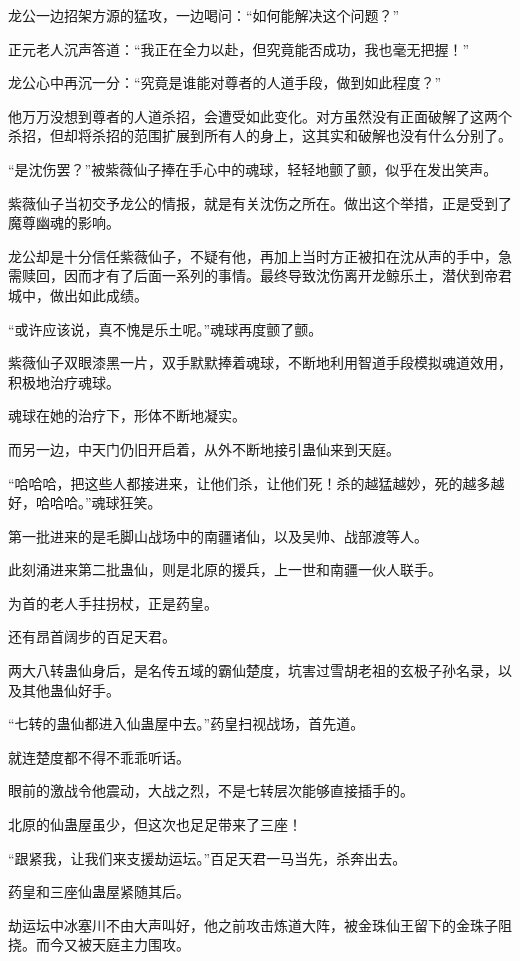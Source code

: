 \begin{this_body}
龙公一边招架方源的猛攻，一边喝问：“如何能解决这个问题？”

正元老人沉声答道：“我正在全力以赴，但究竟能否成功，我也毫无把握！”

龙公心中再沉一分：“究竟是谁能对尊者的人道手段，做到如此程度？”

他万万没想到尊者的人道杀招，会遭受如此变化。对方虽然没有正面破解了这两个杀招，但却将杀招的范围扩展到所有人的身上，这其实和破解也没有什么分别了。

“是沈伤罢？”被紫薇仙子捧在手心中的魂球，轻轻地颤了颤，似乎在发出笑声。

紫薇仙子当初交予龙公的情报，就是有关沈伤之所在。做出这个举措，正是受到了魔尊幽魂的影响。

龙公却是十分信任紫薇仙子，不疑有他，再加上当时方正被扣在沈从声的手中，急需赎回，因而才有了后面一系列的事情。最终导致沈伤离开龙鲸乐土，潜伏到帝君城中，做出如此成绩。

“或许应该说，真不愧是乐土呢。”魂球再度颤了颤。

紫薇仙子双眼漆黑一片，双手默默捧着魂球，不断地利用智道手段模拟魂道效用，积极地治疗魂球。

魂球在她的治疗下，形体不断地凝实。

而另一边，中天门仍旧开启着，从外不断地接引蛊仙来到天庭。

“哈哈哈，把这些人都接进来，让他们杀，让他们死！杀的越猛越妙，死的越多越好，哈哈哈。”魂球狂笑。

第一批进来的是毛脚山战场中的南疆诸仙，以及吴帅、战部渡等人。

此刻涌进来第二批蛊仙，则是北原的援兵，上一世和南疆一伙人联手。

为首的老人手拄拐杖，正是药皇。

还有昂首阔步的百足天君。

两大八转蛊仙身后，是名传五域的霸仙楚度，坑害过雪胡老祖的玄极子孙名录，以及其他蛊仙好手。

“七转的蛊仙都进入仙蛊屋中去。”药皇扫视战场，首先道。

就连楚度都不得不乖乖听话。

眼前的激战令他震动，大战之烈，不是七转层次能够直接插手的。

北原的仙蛊屋虽少，但这次也足足带来了三座！

“跟紧我，让我们来支援劫运坛。”百足天君一马当先，杀奔出去。

药皇和三座仙蛊屋紧随其后。

劫运坛中冰塞川不由大声叫好，他之前攻击炼道大阵，被金珠仙王留下的金珠子阻挠。而今又被天庭主力围攻。


\end{this_body}
